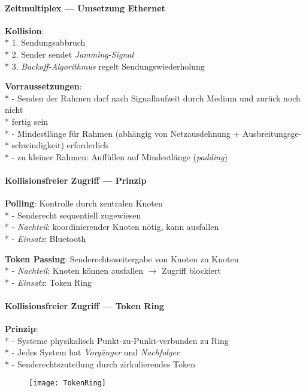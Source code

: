 \paragraph{Zeitmultiplex --- Umsetzung Ethernet}
\begin{items}
  \item \textbf{Kollision}: \\*
    1. Sendungsabbruch \\*
    2. Sender sendet \emph{Jamming-Signal} \\*
    3. \emph{Backoff-Algorithmus} regelt Sendungswiederholung
  \item \textbf{Vorraussetzungen}: \\*
    - Senden der Rahmen darf nach Signallaufzeit durch Medium und zurück noch nicht \\* \phantom{-} \phantom{\( \cdot \)} fertig sein \\*
    - Mindestlänge für Rahmen (abhängig von Netzausdehnung + Ausbreitungsge- \\* \phantom{-} \phantom{\( \cdot \)} schwindigkeit) erforderlich \\*
    - zu kleiner Rahmen: Auffüllen auf Mindestlänge (\emph{padding})
\end{items}

\newpage

\paragraph{Kollisionsfreier Zugriff --- Prinzip}
\begin{items}
  \item \textbf{Polling}: Kontrolle durch zentralen Knoten \\*
    - Senderecht sequentiell zugewiesen \\*
    - \emph{Nachteil}: koordinierender Knoten nötig, kann ausfallen \\*
    - \emph{Einsatz}: Bluetooth
  \item \textbf{Token Passing}: Senderechtsweitergabe von Knoten zu Knoten \\*
    - \emph{Nachteil}: Knoten können ausfallen \( \to \) Zugriff blockiert \\*
    - \emph{Einsatz}: Token Ring
\end{items}

\paragraph{Kollisionsfreier Zugriff --- Token Ring}
\begin{items}
  \item \textbf{Prinzip}: \\*
    - Systeme physikalisch Punkt-zu-Punkt-verbunden zu Ring \\*
    - Jedes System hat \emph{Vorgänger} und \emph{Nachfolger} \\*
    - Senderechtszuteilung durch zirkulierendes Token
\end{items}
\begin{figure}[H]\centering\label{TokenRing}\texttt{[image: TokenRing]}\end{figure}

